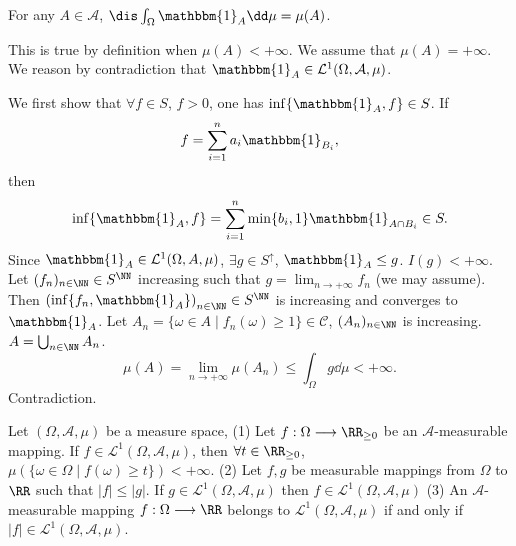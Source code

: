 \begin{propositionenv}
    For any $A\in \mathcal{A}$, $\dis \int_{\Omega} \mathbbm{1}_A \dd\mu=\mu(A)$.
\end{propositionenv}
\begin{proofenv}
    This is true by definition when $\mu(A)<+\infty$.
    We assume that $\mu(A)=+\infty$. We reason by contradiction that $\mathbbm{1}_{A}\in \mathcal{L}^1(\Omega,\mathcal{A},\mu)$.

    \quad We first show that $\forall f\in S$, $f>0$, one has $\inf\{\mathbbm{1}_{A},f\}\in S$.
    If
    $$f=\sum_{i=1}^{n}a_i\mathbbm{1}_{B_i},$$
    then 
    $$\inf\{\mathbbm{1}_A,f\}=\sum_{i=1}^{n}\min\{b_i,1\}\mathbbm{1}_{A\cap B_i}\in S.$$
    Since $\mathbbm{1}_A\in \mathcal{L}^{1}(\Omega,A,\mu)$, $\exists g\in S^\uparrow$, $\mathbbm{1}_{A}\le g$. $I(g)<+\infty$.
    Let $(f_n)_{n\in \NN}\in S^\NN$ increasing such that $g=\lim_{n\rightarrow +\infty} f_n$ (we may assume).
    Then $\left(\inf\{f_n,\mathbbm{1}_A\}\right)_{n\in \NN}\in S^\NN$ is increasing and converges to $\mathbbm{1}_A$. Let $A_n=\{\omega\in A\mid f_n(\omega)\ge 1\}\in \mathcal{C}$, $(A_n)_{n\in \NN}$ is increasing. $A=\bigcup_{n\in \NN}A_n$.
    $$ \mu(A)=\lim_{n\rightarrow +\infty} \mu(A_n)\le \int_{\Omega} g \dd\mu<+\infty.$$
    Contradiction.
\end{proofenv}
\begin{propositionenv}
    Let $(\Omega,\mathcal{A},\mu)$ be a measure space,
    \newline
    (1) Let $f:\Omega\longrightarrow \RR_{\ge 0}$ be an $\mathcal{A}$-measurable mapping.
    If $f\in \mathcal{L}^1(\Omega,\mathcal{A},\mu)$, then $\forall t\in \RR_{\ge 0}$, $\mu(\{\omega\in \Omega \mid f(\omega)\ge t\})<+\infty$.
    \newline
    (2) Let $f,g$ be measurable mappings from $\Omega$ to $\RR$ such that $|f|\le |g|$. If $g\in \mathcal{L}^1(\Omega,\mathcal{A},\mu)$ then $f\in \mathcal{L}^1(\Omega,\mathcal{A},\mu)$
    \newline
    (3) An $\mathcal{A}$-measurable mapping $f:\Omega \longrightarrow \RR$ belongs to $\mathcal{L}^1(\Omega,\mathcal{A},\mu)$ if and only if $|f|\in \mathcal{L}^{1}(\Omega,\mathcal{A},\mu)$.
\end{propositionenv}
